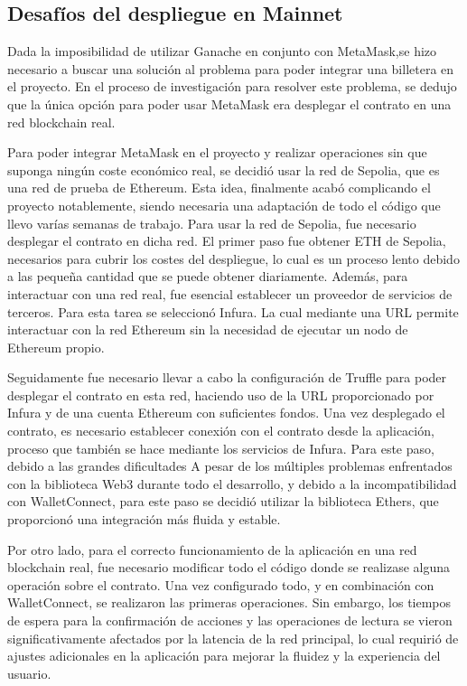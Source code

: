 \subsection{Desafíos del despliegue en Mainnet}

Dada la imposibilidad de utilizar Ganache en conjunto con MetaMask,se hizo necesario a buscar una solución al problema para poder integrar una billetera en el proyecto.
En el proceso de investigación para resolver este problema, se dedujo que la única opción para poder usar MetaMask era desplegar el contrato en una red blockchain real.

Para poder integrar MetaMask en el proyecto y realizar operaciones sin que suponga ningún coste económico real, se decidió usar la red de Sepolia, que es una red de prueba de Ethereum. 
Esta idea, finalmente acabó complicando el proyecto notablemente, siendo necesaria una adaptación de todo el código que llevo varías semanas de trabajo.
Para usar la red de Sepolia, fue necesario desplegar el contrato en dicha red. El primer paso fue obtener ETH de Sepolia, necesarios para cubrir los costes del despliegue, lo cual es un proceso lento debido a las pequeña cantidad que se puede obtener diariamente. 
Además, para interactuar con una red real, fue esencial establecer un proveedor de servicios de terceros. Para esta tarea se seleccionó Infura. La cual mediante una URL permite interactuar con la red Ethereum sin la necesidad de ejecutar un nodo de Ethereum propio. 

Seguidamente fue necesario llevar a cabo la configuración de Truffle para poder desplegar el contrato en esta red, haciendo uso de la URL proporcionado por Infura y de una cuenta Ethereum con suficientes fondos.
Una vez desplegado el contrato, es necesario establecer conexión con el contrato desde la aplicación, proceso que también se hace mediante los servicios de Infura.
Para este paso, debido a las grandes dificultades 
A pesar de los múltiples problemas enfrentados con la biblioteca Web3 durante todo el desarrollo, y debido a la incompatibilidad con WalletConnect, para este paso se decidió utilizar la biblioteca Ethers, que proporcionó una integración más fluida y estable.

Por otro lado, para el correcto funcionamiento de la aplicación en una red blockchain real, fue necesario modificar todo el código donde se realizase alguna operación sobre el contrato.
Una vez configurado todo, y en combinación con WalletConnect, se realizaron las primeras operaciones. Sin embargo, los tiempos de espera para la confirmación de acciones y las operaciones de lectura se vieron significativamente afectados por la latencia de la red principal, lo cual requirió de ajustes adicionales en la aplicación para mejorar la fluidez y la experiencia del usuario.


